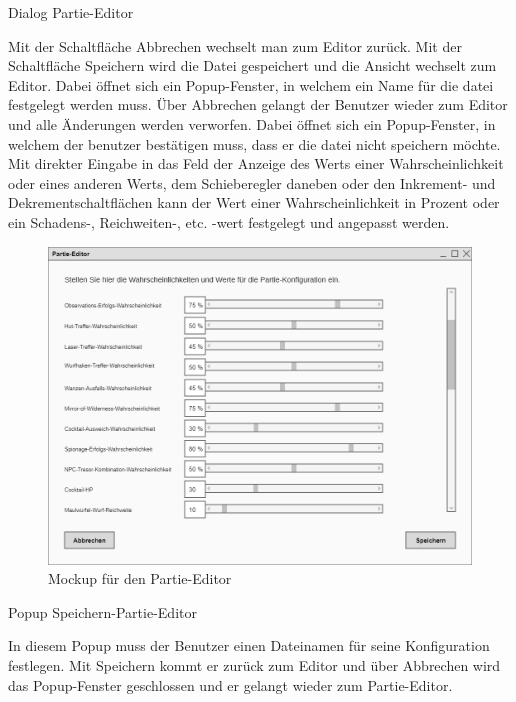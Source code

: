 Dialog \glqq{}Partie-Editor\grqq{}

Mit der Schaltfläche \glqq{}Abbrechen\grqq{} wechselt man zum Editor zurück. Mit der Schaltfläche \glqq{}Speichern\grqq{} wird die Datei gespeichert und die Ansicht wechselt zum Editor. Dabei öffnet sich ein Popup-Fenster, in welchem ein Name für die datei festgelegt werden muss. Über Abbrechen gelangt der Benutzer wieder zum Editor und alle Änderungen werden verworfen. Dabei öffnet sich ein Popup-Fenster, in welchem der benutzer bestätigen muss, dass er die datei nicht speichern möchte. Mit direkter Eingabe in das Feld der Anzeige des Werts einer Wahrscheinlichkeit oder eines anderen Werts, dem Schieberegler daneben oder den Inkrement- und Dekrementschaltflächen kann der Wert einer Wahrscheinlichkeit in Prozent oder ein Schadens-, Reichweiten-, etc. -wert festgelegt und angepasst werden.

\begin{figure}[H]
  \centering
  \includegraphics[width=\textwidth]{Meilenstein03/Partie-Editor_Mockup.png}
  \caption{Mockup für den Partie-Editor}
\end{figure}

Popup \glqq{}Speichern-Partie-Editor\grqq{}

In diesem Popup muss der Benutzer einen Dateinamen für seine Konfiguration festlegen. Mit Speichern kommt er zurück zum Editor und über Abbrechen wird das Popup-Fenster geschlossen und er gelangt wieder zum Partie-Editor.

